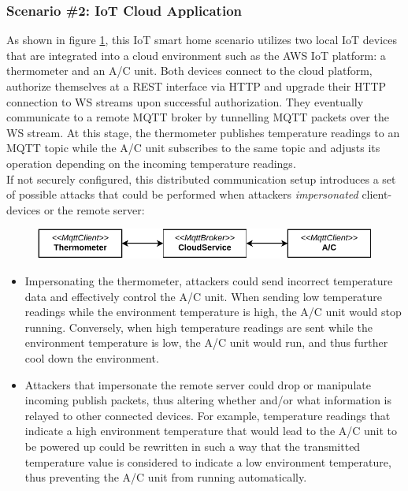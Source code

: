 \subsubsection{Scenario \#2: \ac{IoT} Cloud Application}
\label{par:scenario-2} As shown in figure \ref{fig:arch-smart-home}, this \ac{IoT} smart home scenario utilizes two local \ac{IoT} devices that are integrated into a cloud environment such as the \ac{AWS} \ac{IoT} platform: a thermometer and an \ac{A/C} unit. Both devices connect to the cloud platform, authorize themselves at a \ac{REST} interface via \ac{HTTP} and upgrade their \ac{HTTP} connection to \ac{WS} streams upon successful authorization. They eventually communicate to a remote \ac{MQTT} broker by tunnelling \ac{MQTT} packets over the \ac{WS} stream. At this stage, the thermometer publishes temperature readings to an \ac{MQTT} topic while the \ac{A/C} unit subscribes to the same topic and adjusts its operation depending on the incoming temperature readings. \\
If not securely configured, this distributed communication setup introduces a set of possible attacks that could be performed when attackers \emph{impersonated} client-devices or the remote server:
\begin{figure}[h]
    \centering
    \includegraphics{img/ch04/Scenario_SmartHome.pdf}
    \label{fig:arch-smart-home}
\end{figure}
\begin{itemize}
    \item Impersonating the thermometer, attackers could send incorrect temperature data and effectively control the \ac{A/C} unit. When sending low temperature readings while the environment temperature is high, the \ac{A/C} unit would stop running. Conversely, when high temperature readings are sent while the environment temperature is low, the \ac{A/C} unit would run, and thus further cool down the environment.
    \item Attackers that impersonate the remote server could drop or manipulate incoming publish packets, thus altering whether and/or what information is relayed to other connected devices. For example, temperature readings that indicate a high environment temperature that would lead to the \ac{A/C} unit to be powered up could be rewritten in such a way that the transmitted temperature value is considered to indicate a low environment temperature, thus preventing the \ac{A/C} unit from running automatically.
\end{itemize}

